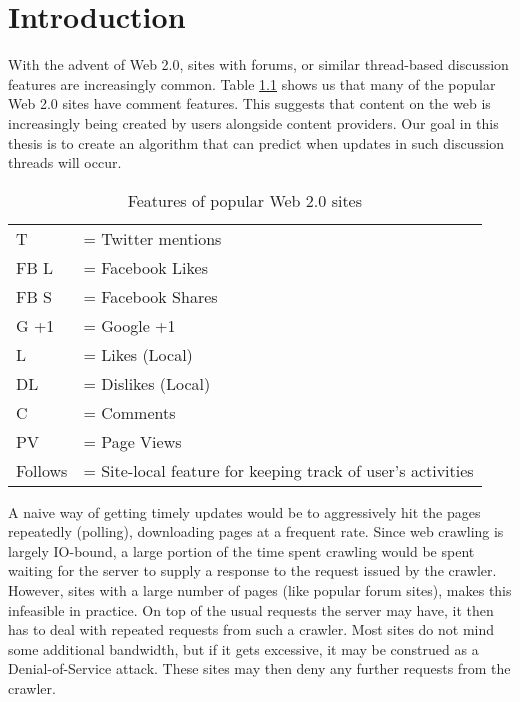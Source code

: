 \chapter{Introduction}

With the advent of Web 2.0, sites with forums, or similar thread-based
discussion features are increasingly common.  Table \ref{table:web20} shows us 
that many of the popular Web 2.0 sites have comment features. This suggests that 
content on the web is increasingly being created by users alongside content 
providers. Our goal in this thesis is to create an algorithm that can predict 
when updates in such discussion threads will occur.

\begin{table}
	{\footnotesize
\caption{Features of popular Web 2.0 sites}
\label{table:web20}
	\begin{tabular}{l l}
		T &= Twitter mentions\\
	 FB L &= Facebook Likes \\
		FB S &= Facebook Shares\\
	G +1 &= Google +1\\
		   L&= Likes (Local) \\
   		DL &= Dislikes (Local) \\
			C &= Comments \\
		PV &= Page Views \\
   Follows &= Site-local feature for keeping track of user's activities
	\end{tabular}
}
\end{table}

A naive way of getting timely updates would be to aggressively hit the pages 
repeatedly (polling), downloading pages at a frequent rate. Since web crawling 
is largely IO-bound, a large portion of the time spent crawling would be spent 
waiting for the server to supply a response to the request issued by the 
crawler. However, sites with a large number of pages (like popular forum sites), 
makes this infeasible in practice. On top of the usual requests the server may 
have, it then has to deal with repeated requests from such a crawler. Most sites 
do not mind some additional bandwidth, but if it gets excessive, it may be 
construed as a Denial-of-Service attack. These sites may then deny any further 
requests from the crawler.

